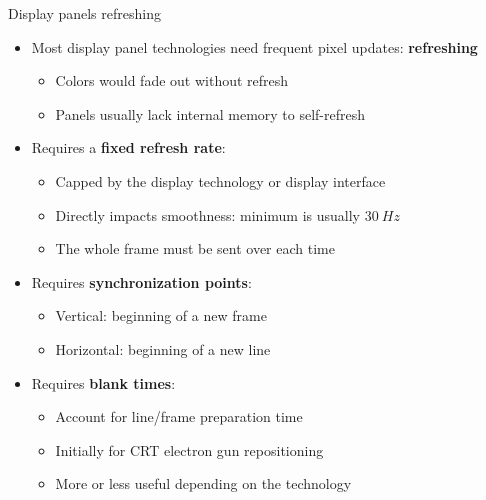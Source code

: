 \begin{frame}{Display panels refreshing}
  \begin{itemize}
  \item Most display panel technologies need frequent pixel updates: \textbf{refreshing}
    \begin{itemize}
    \item Colors would fade out without refresh
    \item Panels usually lack internal memory to self-refresh
    \end{itemize}
  \item Requires a \textbf{fixed refresh rate}:
    \begin{itemize}
    \item Capped by the display technology or display interface
    \item Directly impacts smoothness: minimum is usually \(30~Hz\)
    \item The whole frame must be sent over each time
    \end{itemize}
  \item Requires \textbf{synchronization points}:
    \begin{itemize}
    \item Vertical: beginning of a new frame
    \item Horizontal: beginning of a new line
    \end{itemize}
  \item Requires \textbf{blank times}:
    \begin{itemize}
    \item Account for line/frame preparation time
    \item Initially for CRT electron gun repositioning
    \item More or less useful depending on the technology
    \end{itemize}
  \end{itemize}
\end{frame}

